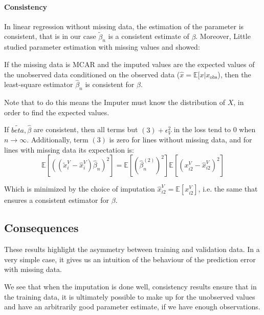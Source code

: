 
\paragraph{Consistency}
In linear regression without missing data, the estimation of the parameter is consistent\cite{consistency_linreg}, that is in our case $\tilde{\beta}_n$ is a consistent estimate of $\beta$. Moreover, Little \cite{little1992missingX} studied parameter estimation with missing values and showed:

\begin{proposition}
If the missing data is MCAR and the imputed values are the expected values of the unobserved data conditioned on the observed data ($\hat{x} = \mathbb{E}[x \vert x_{\text{obs}}$), then the least-square estimator $\hat{\beta}_n$ is consistent for $\beta$.
\end{proposition}

Note that to do this means the Imputer must know the distribution of $X$, in order to find the expected values.

If $\tilde{beta}, \hat{\beta}$ are consistent, then all terms but $(3) + \epsilon_V^2$ in the loss tend to 0 when $n\rightarrow \infty$. Additionally, term $(3)$ is zero for lines without missing data, and for lines with missing data its expectation is:
$$ \mathbb{E}[((\tilde{x}_i^V - \hat{x}_i^V) \hat{\beta}_n)^2] = \mathbb{E}[(\hat{\beta}_n^{(2)})^2] \mathbb{E}[(x_{i2}^V - \hat{x}_{i2}^V)^2] $$

Which is minimized by the choice of imputation  $\hat{x}_{i2}^V = \mathbb{E}[x_{i2}^V]$, i.e. the same that ensures a consistent estimator for $\beta$. 
		\subsection{Consequences}
These results highlight the asymmetry between training and validation data. In a very simple case, it gives us an intuition of the behaviour of the prediction error with missing data.

We see that when the imputation is done well, consistency results ensure that in the training data, it is ultimately possible to make up for the unobserved values and have an arbitrarily good parameter estimate, if we have enough observations.


